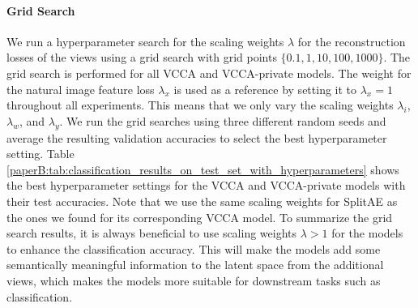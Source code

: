 \paragraph{Grid Search} We run a hyperparameter search for the scaling weights $\lambda$ for the reconstruction losses of the views using a grid search with grid points $\{0.1, 1, 10, 100, 1000\}$. The grid search is performed for all VCCA and VCCA-private models. The weight for the natural image feature loss $\lambda_{x}$ is used as a reference by setting it to $\lambda_{x}=1$ throughout all experiments. This means that we only vary the scaling weights $\lambda_{i}$, $\lambda_{w}$, and $\lambda_{y}$. We run the grid searches using three different random seeds and average the resulting validation accuracies to select the best hyperparameter setting. Table \ref{paperB:tab:classification_results_on_test_set_with_hyperparameters}
shows the best hyperparameter settings for the VCCA and VCCA-private models with their test %
accuracies. Note that we use the same scaling weights for SplitAE as the ones we found for its corresponding VCCA model. To summarize the grid search results, it is always beneficial to use scaling weights $\lambda > 1$ for the models to enhance the classification accuracy. This will make the models add some semantically meaningful information to the latent space from the additional views, which makes the models more suitable for downstream tasks such as classification. 
